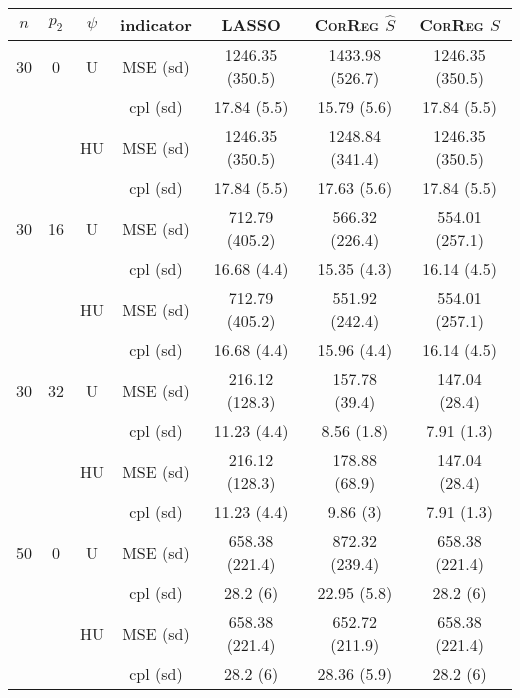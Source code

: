 \documentclass[11pt,a4paper]{article}
\begin{document}
\begin{table}[h!]
\centering
\begin{tabular}{|c|c|c|c|c|c|c|}
\hline 
$n$ & $p_2$&  $\psi$ &indicator &LASSO  &    \textsc{CorReg} $\hat S$& \textsc{CorReg} $S$\\ 
\hline %
30 & 0 & U&MSE (sd) & 1246.35 (350.5) & 1433.98 (526.7) & 1246.35 (350.5) \\
& & & cpl (sd) & 17.84 (5.5) & 15.79 (5.6) & 17.84 (5.5) \\
 &  &HU &MSE (sd) & 1246.35 (350.5) & 1248.84 (341.4) & 1246.35 (350.5) \\
& & & cpl (sd) & 17.84 (5.5) & 17.63 (5.6) & 17.84 (5.5) \\ 
\hline %
30 &16& U & MSE (sd) & 712.79 (405.2) & 566.32 (226.4) & 554.01 (257.1) \\
& & & cpl (sd) & 16.68 (4.4) & 15.35 (4.3) & 16.14 (4.5) \\
 &  & HU & MSE (sd) & 712.79 (405.2) & 551.92 (242.4) & 554.01 (257.1) \\
& & & cpl (sd) & 16.68 (4.4) & 15.96 (4.4) & 16.14 (4.5) \\
\hline %
30 & 32 & U & MSE (sd) & 216.12 (128.3) & 157.78 (39.4) & 147.04 (28.4) \\
& & & cpl (sd) & 11.23 (4.4) & 8.56 (1.8) & 7.91 (1.3) \\
 &  & HU & MSE (sd) & 216.12 (128.3) & 178.88 (68.9) & 147.04 (28.4) \\
& & & cpl (sd) & 11.23 (4.4) & 9.86 (3) & 7.91 (1.3) \\
\hline
\hline %
50 & 0 & U&MSE (sd) & 658.38 (221.4) & 872.32 (239.4) & 658.38 (221.4) \\
& & & cpl (sd) & 28.2 (6) & 22.95 (5.8) & 28.2 (6) \\
 &  & HU &MSE (sd) & 658.38 (221.4) & 652.72 (211.9) & 658.38 (221.4) \\
& & & cpl (sd) & 28.2 (6) & 28.36 (5.9) & 28.2 (6) \\

\end{tabular}
\end{table}
\end{document}
